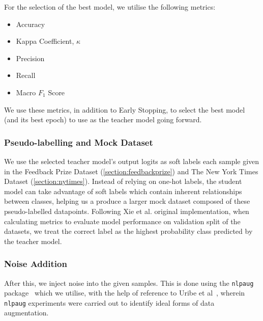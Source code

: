 \documentclass[12pt]{article}
\begin{document}
{For the selection of the best model, we utilise the following metrics\cite{multiclassmetrics}:
\begin{multicols}{3}
   \noindent
\begin{itemize}
    \item Accuracy
    \item Kappa Coefficient, $\kappa$ \cite{kappa_score}
    \item Precision
    \item Recall
    \item Macro $F_1$ Score\cite{macrof1}
\end{itemize}
\end{multicols}
We use these metrics, in addition to Early Stopping\cite{validation_early_stopping}, to select the best model (and its best epoch) to use as the teacher model going forward.
\subsubsection{Pseudo-labelling and Mock Dataset}
We use the selected teacher model's output logits as soft labels each sample given in the Feedback Prize Dataset (\ref{section:feedbackprize}) and The New York Times Dataset (\ref{section:nytimes}). Instead of relying on one-hot labels, the student model can take advantage of soft labels which contain inherent relationships between classes, helping us a produce a larger mock dataset composed of these pseudo-labelled datapoints. Following Xie et al.\cite{noisystudent} original implementation, when calculating metrics to evaluate model performance on validation split of the datasets, we treat the correct label as the highest probability class predicted by the teacher model.
\subsubsection{Noise Addition}
After this, we inject noise into the given samples. This is done using the \texttt{nlpaug} package~\cite{ma2019nlpaug} which we utilise, with the help of reference to Uribe et al~\cite{nlpaugexample}, wherein \texttt{nlpaug} experiments were carried out to identify ideal forms of data augmentation.

}
\end{document}
